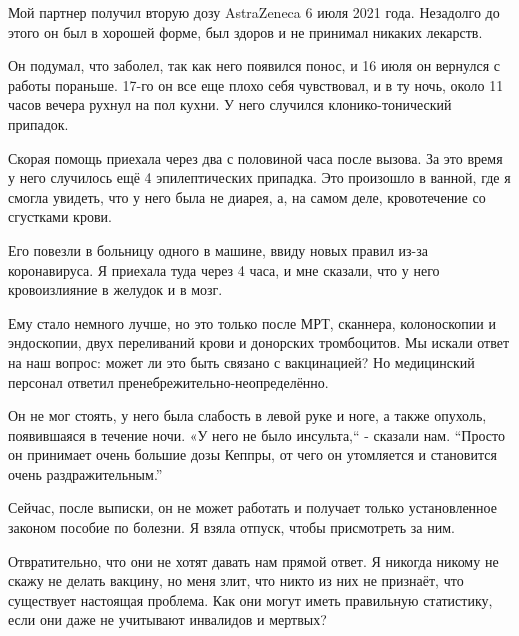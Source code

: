 Мой партнер получил вторую дозу AstraZeneca 6 июля 2021 года. Незадолго до этого
он был в хорошей форме, был здоров и не принимал никаких лекарств.

Он подумал, что заболел, так как него появился понос, и 16 июля он вернулся с
работы пораньше. 17-го он все еще плохо себя чувствовал, и в ту ночь, около 11
часов вечера рухнул на пол кухни. У него случился клонико-тонический припадок.

Скорая помощь приехала через два с половиной часа после вызова. За это время у
него случилось ещё 4 эпилептических припадка. Это произошло в ванной, где я
смогла увидеть, что у него была не диарея, а, на самом деле, кровотечение со
сгустками крови.

Его повезли в больницу одного в машине, ввиду новых правил из-за коронавируса. Я
приехала туда через 4 часа, и мне сказали, что у него кровоизлияние в желудок и
в мозг.

Ему стало немного лучше, но это только после МРТ, сканнера, колоноскопии и
эндоскопии, двух переливаний крови и донорских тромбоцитов. Мы искали ответ на
наш вопрос: может ли это быть связано с вакцинацией? Но медицинский персонал
ответил пренебрежительно-неопределённо.

Он не мог стоять, у него была слабость в левой руке и ноге, а также опухоль,
появившаяся в течение ночи. «У него не было инсульта,“ - сказали нам. “Просто он
принимает очень большие дозы Кеппры, от чего он утомляется и становится очень
раздражительным.”

Сейчас, после выписки, он не может работать и получает только установленное
законом пособие по болезни. Я взяла отпуск, чтобы присмотреть за ним.

Отвратительно, что они не хотят давать нам прямой ответ. Я никогда никому не
скажу не делать вакцину, но меня злит, что никто из них не признаёт, что
существует настоящая проблема. Как они могут иметь правильную статистику, если
они даже не учитывают инвалидов и мертвых?

